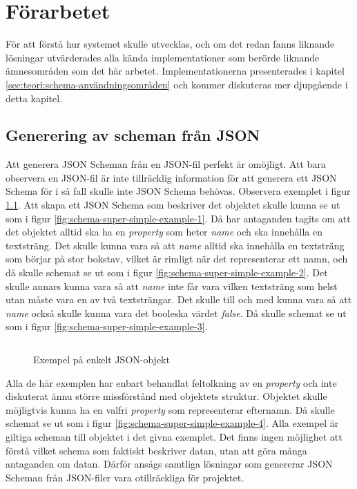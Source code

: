 \chapter{Förarbetet}
\label{sec:forarbete}
För att förstå hur systemet skulle utvecklas, och om det redan fanns liknande lösningar utvärderades alla kända implementationer som berörde liknande ämnesområden som det här arbetet. Implementationerna presenterades i kapitel \ref{sec:teori:schema-användningsområden} och kommer diskuteras mer djupgående i detta kapitel.

\section{Generering av scheman från JSON}
\label{sec:forarbete:json-till-schema}
Att generera JSON Scheman från en JSON-fil perfekt är omöjligt. Att bara observera en JSON-fil är inte tillräcklig information för att generera ett JSON Schema för i så fall skulle inte JSON Schema behövas. Observera exemplet i figur \ref{fig:json-super-simple-example}. Att skapa ett JSON Schema som beskriver det objektet skulle kunna se ut som i figur \ref{fig:schema-super-simple-example-1}. Då har antaganden tagits om att det objektet alltid ska ha en \textit{property} som heter \textit{name} och ska innehålla en textsträng. Det skulle kunna vara så att \textit{name} alltid ska innehålla en textsträng som börjar på stor bokstav, vilket är rimligt när det representerar ett namn, och då skulle schemat se ut som i figur \ref{fig:schema-super-simple-example-2}. Det skulle annars kunna vara så att \textit{name} inte får vara vilken textsträng som helst utan måste vara en av två textsträngar. Det skulle till och med kunna vara så att \textit{name} också skulle kunna vara det booleska värdet \textit{false}. Då skulle schemat se ut som i figur \ref{fig:schema-super-simple-example-3}.

\begin{figure}
	\inputminted[tabsize=2, frame=single, fontsize=\small, framesep=2mm]{json}{code/schema-generation-example/json-file.json}
	\vspace{-1.7em}
	\caption{Exempel på enkelt JSON-objekt}
	\label{fig:json-super-simple-example}
\end{figure}

Alla de här exemplen har enbart behandlat feltolkning av en \textit{property} och inte diskuterat ännu större missförstånd med objektets struktur. Objektet skulle möjligtvis kunna ha en valfri \textit{property} som representerar efternamn. Då skulle schemat se ut som i figur \ref{fig:schema-super-simple-example-4}. Alla exempel är giltiga scheman till objektet i det givna exemplet. Det finns ingen möjlighet att förstå vilket schema som faktiskt beskriver datan, utan att göra många antaganden om datan. Därför ansågs samtliga lösningar som genererar JSON Scheman från JSON-filer vara otillräckliga för projektet.

